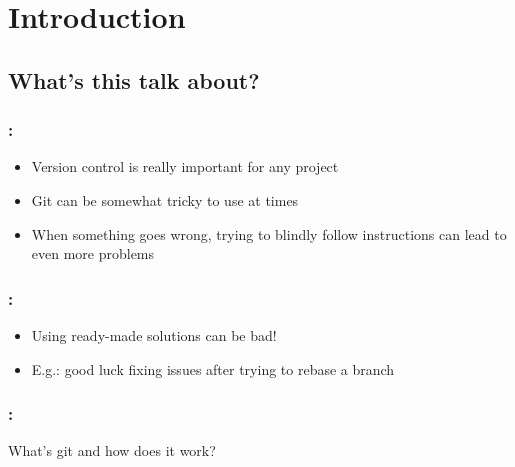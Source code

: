\section{Introduction}

\subsection{What's this talk about?}

\begin{frame}
    \frametitle{\secname: \small\subsecname\normalsize}

    \begin{itemize}
        \item Version control is really important for any project
        \item Git can be somewhat tricky to use at times
        \item When something goes wrong, trying to blindly follow instructions can lead to even more problems
    \end{itemize}

\end{frame}

\begin{frame}
    \frametitle{\secname: \small\subsecname\normalsize}

    \begin{itemize}
        \item Using ready-made solutions can be bad!
        \item E.g.: good luck fixing issues after trying to rebase a branch
    \end{itemize}

\end{frame}

\begin{frame}
    \frametitle{\secname: \small\subsecname\normalsize}

    What's git and how does it work?

\end{frame}
